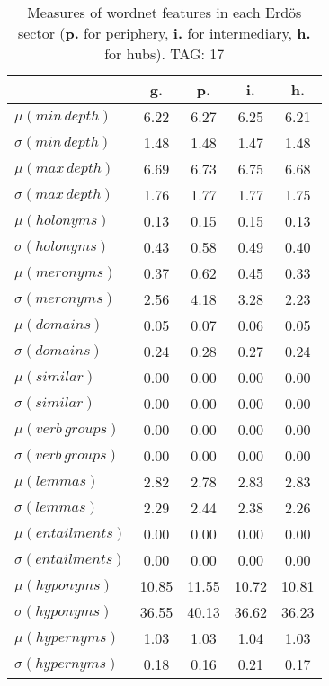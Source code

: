 \begin{table}[h!]
\begin{center}
\begin{tabular}{| l || c | c | c | c |}\hline
 & {\bf g.} & {\bf p.} & {\bf i.} & {\bf h.} \\\hline\hline
$\mu(min\,depth)$ & 6.22  & 6.27  & 6.25  & 6.21 \\
$\sigma(min\,depth)$ & 1.48  & 1.48  & 1.47  & 1.48 \\\hline
$\mu(max\,depth)$ & 6.69  & 6.73  & 6.75  & 6.68 \\
$\sigma(max\,depth)$ & 1.76  & 1.77  & 1.77  & 1.75 \\\hline
$\mu(holonyms)$ & 0.13  & 0.15  & 0.15  & 0.13 \\
$\sigma(holonyms)$ & 0.43  & 0.58  & 0.49  & 0.40 \\\hline
$\mu(meronyms)$ & 0.37  & 0.62  & 0.45  & 0.33 \\
$\sigma(meronyms)$ & 2.56  & 4.18  & 3.28  & 2.23 \\\hline
$\mu(domains)$ & 0.05  & 0.07  & 0.06  & 0.05 \\
$\sigma(domains)$ & 0.24  & 0.28  & 0.27  & 0.24 \\\hline
$\mu(similar)$ & 0.00  & 0.00  & 0.00  & 0.00 \\
$\sigma(similar)$ & 0.00  & 0.00  & 0.00  & 0.00 \\\hline
$\mu(verb\,groups)$ & 0.00  & 0.00  & 0.00  & 0.00 \\
$\sigma(verb\,groups)$ & 0.00  & 0.00  & 0.00  & 0.00 \\\hline
$\mu(lemmas)$ & 2.82  & 2.78  & 2.83  & 2.83 \\
$\sigma(lemmas)$ & 2.29  & 2.44  & 2.38  & 2.26 \\\hline
$\mu(entailments)$ & 0.00  & 0.00  & 0.00  & 0.00 \\
$\sigma(entailments)$ & 0.00  & 0.00  & 0.00  & 0.00 \\\hline
$\mu(hyponyms)$ & 10.85  & 11.55  & 10.72  & 10.81 \\
$\sigma(hyponyms)$ & 36.55  & 40.13  & 36.62  & 36.23 \\\hline
$\mu(hypernyms)$ & 1.03  & 1.03  & 1.04  & 1.03 \\
$\sigma(hypernyms)$ & 0.18  & 0.16  & 0.21  & 0.17 \\\hline
\end{tabular}
\caption{Measures of wordnet features in each Erd\"os sector ({{\bf p.}} for periphery, {{\bf i.}} for intermediary, {{\bf h.}} for hubs). TAG: 17}
\end{center}
\end{table}